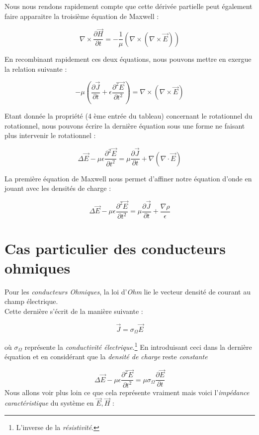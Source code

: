 Nous nous rendons rapidement compte que cette dérivée partielle peut également faire apparaitre la troisième équation de Maxwell : 

\[ \nabla \times \frac{\partial \vec{H}}{\partial t} = -\frac{1}{\mu}( \nabla \times (\nabla \times \vec{E}))\]

En recombinant rapidement ces deux équations, nous pouvons mettre en exergue la relation suivante : 

\[-\mu(\frac{\partial \vec{J}}{\partial t} + \epsilon \frac{\partial^{2} \vec{E}}{\partial t^{2}}) = \nabla \times (\nabla \times \vec{E})\]

Etant donnée la propriété (4 ème entrée du tableau) concernant le rotationnel du rotationnel, 
nous pouvons écrire la dernière équation sous une forme ne faisant plus intervenir le rotationnel : 

\[ \Delta \vec{E} - \mu \epsilon  \frac{\partial^{2} \vec{E}}{\partial t^{2}} = \mu \frac{\partial \vec{J}}{\partial t} + \nabla(\nabla \cdot \vec{E}) \]

La première équation de Maxwell nous permet d'affiner notre équation d'onde en jouant avec les densités de charge : 

\[ \Delta \vec{E} - \mu \epsilon  \frac{\partial^{2} \vec{E}}{\partial t^{2}} = \mu \frac{\partial \vec{J}}{\partial t} + \frac{\nabla \rho}{\epsilon} \]

\section{Cas particulier des conducteurs ohmiques}

Pour les \textit{conducteurs Ohmiques}, la loi d'\textit{Ohm} lie le vecteur densité de courant au champ électrique. \\
Cette dernière s'écrit de la manière suivante : 

\[\vec{J} = \sigma_{\Omega} \vec{E} \]

où $\sigma_{\Omega}$ représente la \textit{conductivité électrique}.\footnote{L'inverse de la \textit{résistivité}.} En introduisant ceci dans la dernière équation et en considérant que la
\textit{densité de charge} reste \textit{constante} 

\[ \Delta \vec{E} - \mu \epsilon  \frac{\partial^{2} \vec{E}}{\partial t^{2}} = \mu \sigma_{\Omega} \frac{\partial \vec{E}}{\partial t} \]
Nous allons voir plus loin ce que cela représente vraiment mais voici l'\textit{impédance caractéristique} du système en $\vec{E},\vec{H}$ : 

